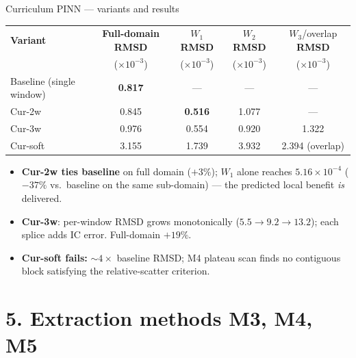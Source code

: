 \documentclass[aspectratio=169, 11pt]{beamer}
\begin{document}
\begin{frame}{Curriculum PINN --- variants and results}
  \centering\scriptsize
  \renewcommand{\arraystretch}{1.05}
  \begin{tabular}{@{}lcccc@{}}
    \toprule
    \textbf{Variant} & \textbf{Full-domain RMSD} & $W_{1}$ \textbf{RMSD}
                     & $W_{2}$ \textbf{RMSD} & $W_{3}$/overlap \textbf{RMSD} \\
                     & ($\times 10^{-3}$) & ($\times 10^{-3}$) & ($\times 10^{-3}$) & ($\times 10^{-3}$) \\
    \midrule
    Baseline (single window) & \textbf{0.817} & --- & --- & --- \\
    \midrule
    Cur-2w   & 0.845 & \textbf{0.516} & 1.077 & --- \\
    Cur-3w   & 0.976 & 0.554          & 0.920 & 1.322 \\
    Cur-soft & 3.155 & 1.739          & 3.932 & 2.394 (overlap) \\
    \bottomrule
  \end{tabular}
  \vspace{2mm}

  \begin{itemize}\scriptsize
    \item \textbf{Cur-2w ties baseline} on full domain ($+3\%$); $W_{1}$ alone
          reaches $5.16\!\times\!10^{-4}$ ($-37\%$ vs.\ baseline on the same
          sub-domain) --- the predicted local benefit \emph{is} delivered.
    \item \textbf{Cur-3w}: per-window RMSD grows monotonically
          ($5.5\!\to\!9.2\!\to\!13.2$); each splice adds IC error.
          Full-domain $+19\%$.
    \item \textbf{Cur-soft fails:} $\sim\!4\times$ baseline RMSD; M4 plateau
          scan finds no contiguous block satisfying the relative-scatter criterion.
  \end{itemize}

\end{frame}


\section{5. Extraction methods M3, M4, M5}
\end{document}
